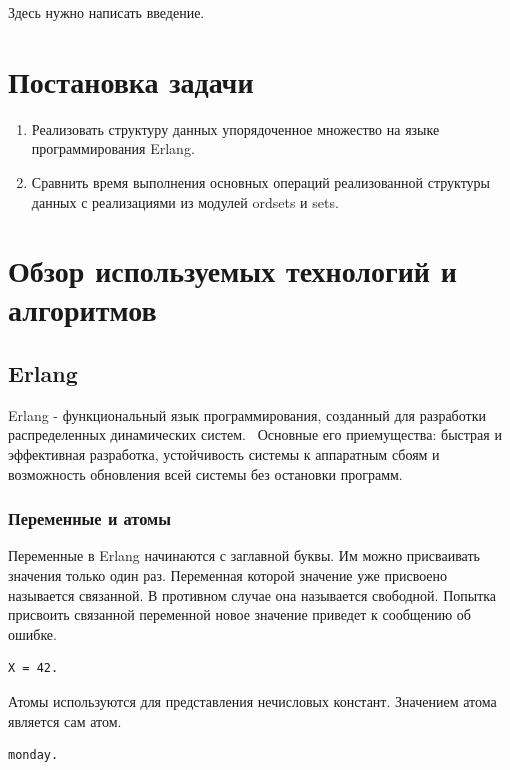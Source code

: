 





\Intro

Здесь нужно написать введение.

\section{Постановка задачи}
	\begin{enumerate}
		\item Реализовать структуру данных упорядоченное множество на языке программирования Erlang.
		\item Сравнить время выполнения основных операций реализованной структуры данных с реализациями из модулей
			  ordsets и sets. 
	\end{enumerate}

\section{Обзор используемых технологий и алгоритмов}
	\subsection{Erlang}
		Erlang - функциональный язык программирования, созданный для разработки	распределенных динамических систем.~\cite{erl} 
		Основные его приемущества: быстрая и эффективная разработка, устойчивость системы к аппаратным сбоям и 
		возможность обновления всей системы без остановки программ.

		\subsubsection{Переменные и атомы} 
			Переменные в Erlang начинаются с заглавной буквы. Им можно присваивать значения только один раз. 
			Переменная которой значение уже присвоено называется связанной. В противном случае она называется свободной. 
			Попытка присвоить связанной переменной новое значение приведет к сообщению об ошибке.
			\begin{lstlisting}
X = 42.
			\end{lstlisting}

			Атомы используются для представления нечисловых констант. Значением атома является сам атом.
			\begin{lstlisting}
monday.
			\end{lstlisting}  

